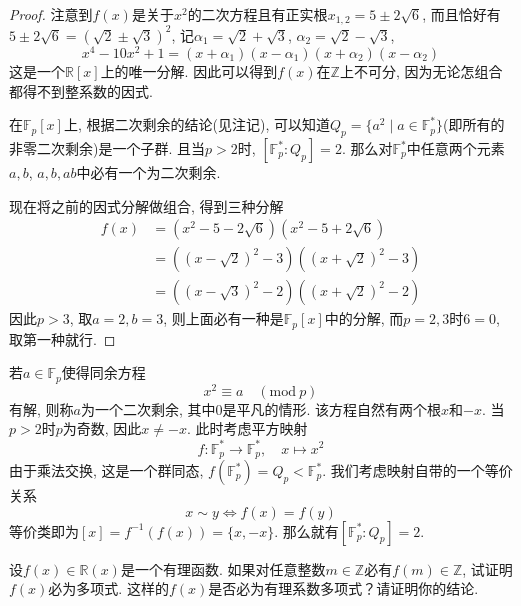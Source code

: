 \begin{proof}
    注意到$f(x)$是关于$x^2$的二次方程且有正实根$x_{1,2} =  5 \pm 2\sqrt{6}$, 而且恰好有$5 \pm 2\sqrt{6} = (\sqrt{2} \pm \sqrt{3})^2$, 记$\alpha_1 = \sqrt{2} + \sqrt{3}$, $\alpha_2 = \sqrt{2} - \sqrt{3}$,
    \[
        x^4 - 10x^2 + 1 = (x + \alpha_1)(x - \alpha_1)(x + \alpha_2)(x - \alpha_2)
    \]
    这是一个$\mathbb{R}[x]$上的唯一分解. 因此可以得到$f(x)$在$\mathbb{Z}$上不可分, 因为无论怎组合都得不到整系数的因式.

    在$\mathbb{F}_p[x]$上, 根据二次剩余的结论(见注记), 可以知道$Q_p = \{a^2 \mid a \in \mathbb{F}_p^*\}$(即所有的非零二次剩余)是一个子群. 且当$p > 2$时, $[\mathbb{F}_p^*:Q_p] = 2$. 那么对$\mathbb{F}_p^*$中任意两个元素$a, b$, $a, b, ab$中必有一个为二次剩余.

    现在将之前的因式分解做组合, 得到三种分解
    \[
    \begin{aligned}
        f(x) &= (x^2 - 5 - 2\sqrt{6})(x^2 - 5 + 2\sqrt{6})\\
        &= ((x - \sqrt{2})^2 - 3)((x + \sqrt{2})^2 - 3)\\
        &= ((x - \sqrt{3})^2 - 2)((x + \sqrt{2})^2 - 2)
    \end{aligned}
    \]
    因此$p > 3$, 取$a = 2, b = 3$, 则上面必有一种是$\mathbb{F}_p[x]$中的分解, 而$p = 2, 3$时$6 = 0$, 取第一种就行.
\end{proof}

\begin{remark}
    若$a \in \mathbb{F}_p$使得同余方程
    \[
        x^2 \equiv a \quad (\mathrm{mod}~p)
    \]
    有解, 则称$a$为一个二次剩余, 其中$0$是平凡的情形. 该方程自然有两个根$x$和$-x$. 当$p > 2$时$p$为奇数, 因此$x \neq -x$. 此时考虑平方映射
    \[
        f: \mathbb{F}_p^* \to \mathbb{F}_p^*,\quad x \mapsto x^2
    \]
    由于乘法交换, 这是一个群同态, $f(\mathbb{F}_p^*) = Q_p < \mathbb{F}_p^*$. 我们考虑映射自带的一个等价关系
    \[
        x \sim y \iff f(x) = f(y)
    \]
    等价类即为$[x] = f^{-1}(f(x)) = \{x, -x\}$. 那么就有$[\mathbb{F}_p^*:Q_p] = 2$.
\end{remark}

\begin{problem}
    设$f(x) \in \mathbb{R}(x)$是一个有理函数. 如果对任意整数$m \in \mathbb{Z}$必有$f(m) \in \mathbb{Z}$, 试证明$f(x)$必为多项式. 这样的$f(x)$是否必为有理系数多项式？请证明你的结论.
\end{problem}

